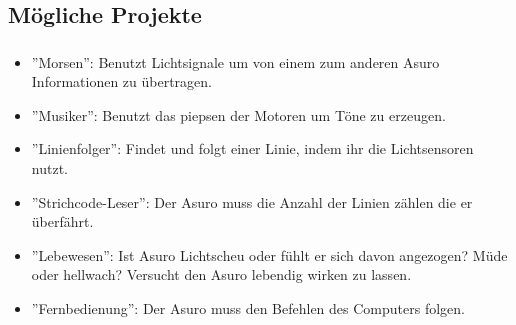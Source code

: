 \subsection{Mögliche Projekte}
\begin{frame}[c]
	\frametitle{\currentsection}
	\framesubtitle{\currentsubsection}
	\begin{itemize}
		\item ''Morsen'': Benutzt Lichtsignale um von einem zum anderen Asuro Informationen zu übertragen.
		\item ''Musiker'': Benutzt das piepsen der Motoren um Töne zu erzeugen.
		\item ''Linienfolger'': Findet und folgt einer Linie, indem ihr die Lichtsensoren nutzt.
		\item ''Strichcode-Leser'': Der Asuro muss die Anzahl der Linien zählen die er überfährt.
		\item ''Lebewesen'': Ist Asuro Lichtscheu oder fühlt er sich davon angezogen? Müde oder hellwach? Versucht den Asuro lebendig wirken zu lassen.
		\item ''Fernbedienung'': Der Asuro muss den Befehlen des Computers folgen.		
	\end{itemize}
\end{frame}